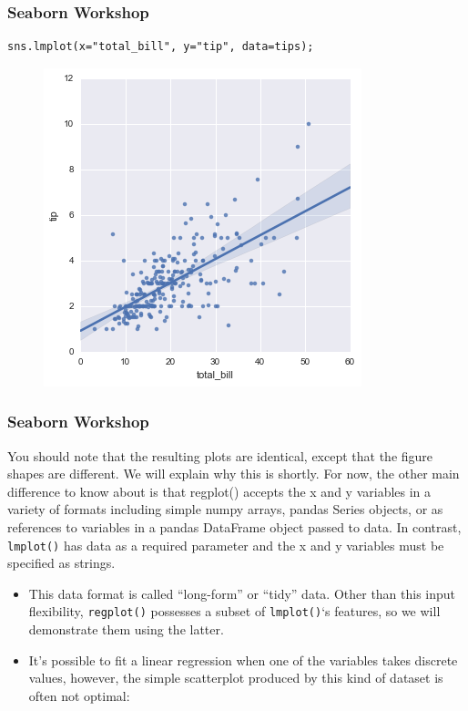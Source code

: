 \documentclass{beamer}
\begin{document}
\begin{frame}[fragile]
	\frametitle{Seaborn Workshop}
	\large
\begin{verbatim}
sns.lmplot(x="total_bill", y="tip", data=tips);
\end{verbatim}
\begin{figure}
	\centering
	\includegraphics[width=0.7\linewidth]{images/regression_10_0}
\end{figure}
\end{frame}
\begin{frame}[fragile]
	\frametitle{Seaborn Workshop}
	\large
You should note that the resulting plots are identical, except that the figure shapes are different. We will explain why this is shortly. For now, the other main difference to know about is that regplot() accepts the x and y variables in a variety of formats including simple numpy arrays, pandas Series objects, or as references to variables in a pandas DataFrame object passed to data. In contrast, \texttt{lmplot()} has data as a required parameter and the x and y variables must be specified as strings. 

\end{frame}
\begin{frame}[fragile]
	\large
	
\begin{itemize}
\item This data format is called “long-form” or “tidy” data. Other than this input flexibility, \texttt{regplot()} possesses a subset of \texttt{lmplot()}‘s features, so we will demonstrate them using the latter.

\item It’s possible to fit a linear regression when one of the variables takes discrete values, however, the simple scatterplot produced by this kind of dataset is often not optimal:
\end{itemize}
\end{frame}
\end{document}
